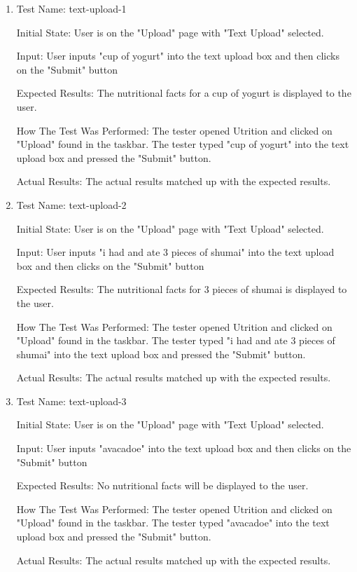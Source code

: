 \documentclass[12pt, titlepage]{article}
\begin{document}
\begin{enumerate}
		\item{Test Name: text-upload-1}
		
		Initial State: User is on the "Upload" page with "Text Upload" selected.
		
		Input: User inputs "cup of yogurt" into the text upload box and then clicks on the "Submit" button
		
		Expected Results: The nutritional facts for a cup of yogurt is displayed to the user.
		
		How The Test Was Performed: The tester opened Utrition and clicked on "Upload" found in the taskbar. The tester typed "cup of yogurt" into the text upload box and pressed the "Submit" button.
		
		Actual Results: The actual results matched up with the expected results.
		
		\item{Test Name: text-upload-2}
		
		Initial State: User is on the "Upload" page with "Text Upload" selected.
		
		Input: User inputs "i had and ate 3 pieces of shumai" into the text upload box and then clicks on the "Submit" button
		
		Expected Results: The nutritional facts for 3 pieces of shumai is displayed to the user.
		
		How The Test Was Performed: The tester opened Utrition and clicked on "Upload" found in the taskbar. The tester typed "i had and ate 3 pieces of shumai" into the text upload box and pressed the "Submit" button.
		
		Actual Results: The actual results matched up with the expected results.
		
		\item{Test Name: text-upload-3}
		
		Initial State: User is on the "Upload" page with "Text Upload" selected.
		
		Input: User inputs "avacadoe" into the text upload box and then clicks on the "Submit" button
		
		Expected Results: No nutritional facts will be displayed to the user.
		
		How The Test Was Performed: The tester opened Utrition and clicked on "Upload" found in the taskbar. The tester typed "avacadoe" into the text upload box and pressed the "Submit" button.
		
		Actual Results: The actual results matched up with the expected results.
		

\end{enumerate}
\end{document}
